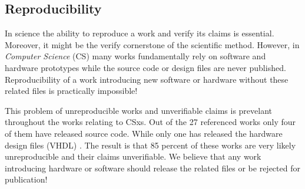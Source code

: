 


\subsection{Reproducibility}

In science the ability to reproduce a work and verify its claims is essential.
Moreover, it might be the verify cornerstone of the scientific method. However,
in \textit{Computer Science} (CS) many works fundamentally rely on software and
hardware prototypes while the source code or design files are never published.
Reproducibility of a work introducing new software or hardware without these
related files is practically impossible!

This problem of unreproducible works and unverifiable claims is prevelant
throughout the works relating to CSxs. Out of the 27 referenced works only four
\cite{10.14778/3137628.3137632, 234968, 8839401, lukken2021zcsd}
\footnotemark[8] of them have released source code. While only one has released
the hardware design files (VHDL) \cite{10.14778/3137628.3137632}. The result is
that 85 percent of these works are very likely unreproducible and their claims
unverifiable. We believe that any work introducing hardware or software should
release the related files or be rejected for publication!


